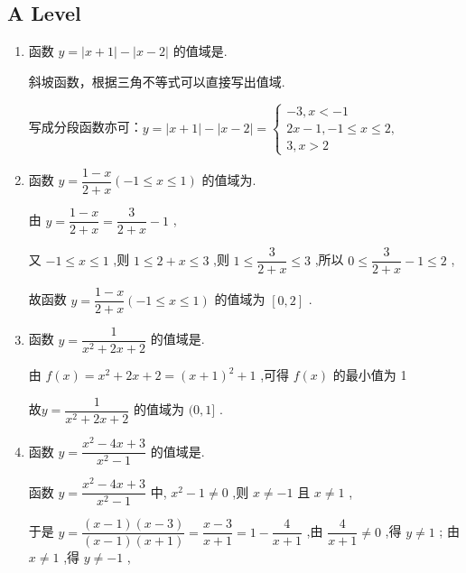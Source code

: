 \subsection*{A Level}
\begin{enumerate}
    \item 函数 $y = \left| {x + 1}\right|  - \left| {x - 2}\right|$ 的值域是.
    \begin{jieda}
        斜坡函数，根据三角不等式可以直接写出值域.
        
        写成分段函数亦可：$y = \left| {x + 1}\right|  - \left| {x - 2}\right|  = \left\{  \begin{array}{l}  - 3,x <  - 1 \\  {2x} - 1, - 1 \leq  x \leq  2, \\  3,x > 2 \end{array}\right.$
    \end{jieda}
    \item 函数 $y = \dfrac{1 - x}{2 + x}\left( {-1 \leq  x \leq  1}\right)$ 的值域为.
    \begin{jieda}
        由 $y = \dfrac{1 - x}{2 + x} = \dfrac{3}{2 + x} - 1$ ,
        
        又 $- 1 \leq  x \leq  1$ ,则 $1 \leq  2 + x \leq  3$ ,则 $1 \leq  \dfrac{3}{2 + x} \leq  3$ ,所以 $0 \leq  \dfrac{3}{2 + x} - 1 \leq  2$ ,
        
        故函数 $y = \dfrac{1 - x}{2 + x}\left( {-1 \leq  x \leq  1}\right)$ 的值域为 $\left\lbrack  {0,2}\right\rbrack$ .
    \end{jieda}
    \item 函数 $y = \dfrac{1}{{x}^{2} + {2x} + 2}$ 的值域是.
    \begin{jieda}
        由 $f\left( x\right)  = {x}^{2} + {2x} + 2 = {\left( x + 1\right) }^{2} + 1$ ,可得 $f\left( x\right)$ 的最小值为 1
        
        故$y = \dfrac{1}{{x}^{2} + {2x} + 2}$ 的值域为 $(0,1\rbrack$ .
    \end{jieda} 
    \item 函数 $y = \dfrac{{x}^{2} - {4x} + 3}{{x}^{2} - 1}$ 的值域是.
    \begin{jieda}
        函数 $y = \dfrac{{x}^{2} - {4x} + 3}{{x}^{2} - 1}$ 中, ${x}^{2} - 1 \neq  0$ ,则 $x \neq   - 1$ 且 $x \neq  1$ ,
        
        于是 $y = \dfrac{\left( {x - 1}\right) \left( {x - 3}\right) }{\left( {x - 1}\right) \left( {x + 1}\right) } = \dfrac{x - 3}{x + 1} = 1 - \dfrac{4}{x + 1}$ ,由 $\dfrac{4}{x + 1} \neq  0$ ,得 $y \neq  1$ ; 由 $x \neq  1$ ,得 $y \neq   - 1$ ,
        

\end{jieda}
\end{enumerate}
